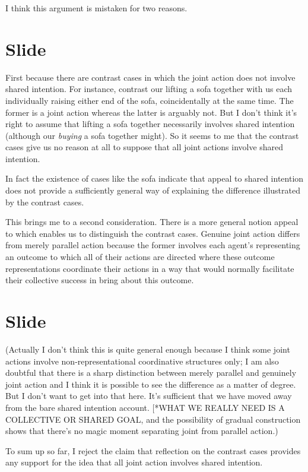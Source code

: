 \documentclass[12pt,\papersize]{extarticle}
\begin{document}
I think this argument is mistaken for two reasons.


\section{Slide}
First because there are contrast cases in which the joint action does not involve shared intention.
For instance, contrast our lifting a sofa together with us each individually raising either end of the sofa, coincidentally at the same time.
The former is a joint action whereas the latter is arguably not.
But I don't think it's right to assume that lifting a sofa together necessarily involves shared intention (although our \emph{buying} a sofa together might).
So it seems to me that the contrast cases give us no reason at all to suppose that all joint actions involve shared intention.

In fact the existence of cases like the sofa indicate that appeal to shared intention does not provide a sufficiently general way of explaining the difference illustrated by the contrast cases.

This brings me to a second consideration.
There is a more general notion appeal to which enables us to distinguish the contrast cases.
Genuine joint action differs from merely parallel action because the former involves each agent’s representing an outcome to which all of their actions are directed where these outcome representations coordinate their actions in a way that would normally facilitate their collective success in bring about this outcome.



\section{Slide}
(Actually I don’t think this is quite general enough because I think some joint actions involve non-representational coordinative structures only; I am also doubtful that there is a sharp distinction between merely parallel and genuinely joint action and I think it is possible to see the difference as a matter of degree. But I don’t want to get into that here.  It’s sufficient that we have moved away from the bare shared intention account. [*WHAT WE REALLY NEED IS A COLLECTIVE OR SHARED GOAL, and the possibility of gradual construction shows that there’s no magic moment separating joint from parallel action.)

To sum up so far, I reject the claim that reflection on the contrast cases provides any support for the idea that all joint action involves shared intention.
\end{document}
